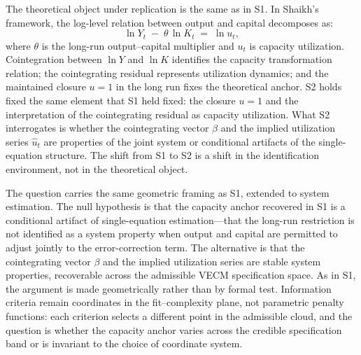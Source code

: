 \documentclass[11pt,a4paper]{article}
\begin{document}
The theoretical object under replication is the same as in S1. In Shaikh's
framework, the log-level relation between output and capital decomposes as:
%
\begin{equation}
	\label{eq:S2_capacity}
	\ln Y_t \;-\; \theta \,\ln K_t \;=\; \ln u_t,
\end{equation}
%
where $\theta$ is the long-run output--capital multiplier and $u_t$ is
capacity utilization. Cointegration between $\ln Y$ and $\ln K$ identifies
the capacity transformation relation; the cointegrating residual represents
utilization dynamics; and the maintained closure $u = 1$ in the long run
fixes the theoretical anchor. S2 holds fixed the same element that S1 held
fixed: the closure $u = 1$ and the interpretation of the cointegrating
residual as capacity utilization. What S2 interrogates is whether the
cointegrating vector $\beta$ and the implied utilization series
$\widehat{u}_t$ are properties of the joint system or conditional artifacts
of the single-equation structure. The shift from S1 to S2 is a shift in the
identification environment, not in the theoretical object.


The question carries the same geometric framing as S1, extended to system
estimation. The null hypothesis is that the capacity anchor recovered in S1
is a conditional artifact of single-equation estimation---that the long-run
restriction is not identified as a system property when output and capital
are permitted to adjust jointly to the error-correction term. The alternative
is that the cointegrating vector $\beta$ and the implied utilization series
are stable system properties, recoverable across the admissible VECM
specification space. As in S1, the argument is made geometrically rather than
by formal test. Information criteria remain coordinates in the
fit--complexity plane, not parametric penalty functions: each criterion
selects a different point in the admissible cloud, and the question is
whether the capacity anchor varies across the credible specification band or
is invariant to the choice of coordinate system.

\end{document}
